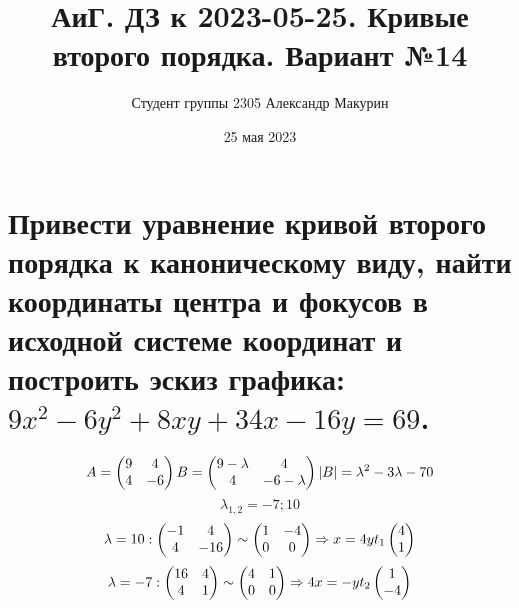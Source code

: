 \documentclass[12pt]{article}
\title{АиГ. ДЗ к 2023-05-25. Кривые второго порядка. Вариант №14}
\author{Студент группы 2305 Александр Макурин}
\date{25 мая 2023}
\begin{document}
\maketitle
\section{Привести уравнение кривой второго порядка к каноническому виду, найти координаты центра и фокусов в исходной системе координат и построить эскиз графика: $9x^2 - 6y^2 + 8xy + 34x - 16y = 69$.}
\[
    A = \begin{pmatrix}
        9 & 4  \\
        4 & -6 \\
    \end{pmatrix} \\
    B = \begin{pmatrix}
        9 - \lambda & 4            \\
        4           & -6 - \lambda \\
    \end{pmatrix} \\
    |B| = \lambda^2 - 3\lambda - 70
\]
\[
    \lambda_{1,2} = -7; 10
\]
\[
    \lambda = 10: \begin{pmatrix}
        -1 & 4   \\
        4  & -16 \\
    \end{pmatrix} \sim \begin{pmatrix}
        1 & -4 \\
        0 & 0  \\
    \end{pmatrix}
    \Rightarrow x = 4y \\
    t_1\begin{pmatrix} 4 \\ 1 \end{pmatrix}
\]
\[
    \lambda = -7: \begin{pmatrix}
        16 & 4 \\
        4  & 1 \\
    \end{pmatrix} \sim \begin{pmatrix}
        4 & 1 \\
        0 & 0 \\
    \end{pmatrix}
    \Rightarrow 4x = -y \\
    t_2\begin{pmatrix} 1 \\ -4 \end{pmatrix}
\]
\end{document}
